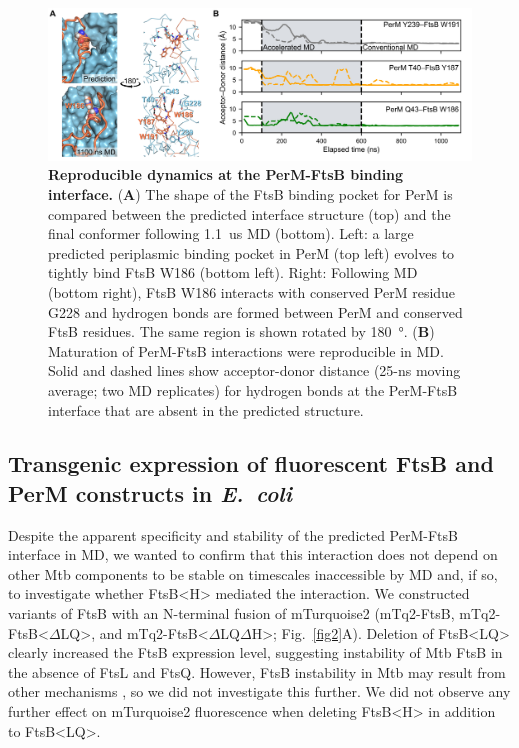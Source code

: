 \documentclass[twocolumn,pdflatex,sn-nature]{sn-jnl}%
\def\textsuperscript#1{<#1>}%
\newcommand\ec{\textit{E.~coli}}
\newcommand\mtb{Mtb}
\newcommand\ftsbLQ{FtsB\textsuperscript{LQ}}
\newcommand\ftsbH{FtsB\textsuperscript{H}}
\newcommand\ftsbdLQ{FtsB\textsuperscript{$\Delta{}$LQ}}
\newcommand\ftsbdLQdH{FtsB\textsuperscript{$\Delta{}$LQ$\Delta{}$H}}
\begin{document}
\begin{figure}[htb]
    \centering
    \includegraphics[width=1.0\textwidth]{../figures/fig1_2.png}
    \caption{
        \textbf{Reproducible dynamics at the PerM-FtsB binding interface.}
        (\textbf{A}) The shape of the FtsB binding pocket for PerM is compared between the predicted interface structure (top) and the final conformer following \qty{1.1}{us} MD (bottom). Left: a large predicted periplasmic binding pocket in PerM (top left) evolves to tightly bind FtsB W186 (bottom left). Right: Following MD (bottom right), FtsB W186 interacts with conserved PerM residue G228 and hydrogen bonds are formed between PerM and conserved FtsB residues. The same region is shown rotated by \qty{180}{\degree}.
        (\textbf{B}) Maturation of PerM-FtsB interactions were reproducible in MD. Solid and dashed lines show acceptor-donor distance (25-ns moving average; two MD replicates) for hydrogen bonds at the PerM-FtsB interface that are absent in the predicted structure.
    }\label{fig1_2}
\end{figure}

\subsection{Transgenic expression of fluorescent FtsB and PerM constructs in \ec{}}

Despite the apparent specificity and stability of the predicted PerM-FtsB interface in MD, we wanted to confirm that this interaction does not depend on other \mtb{} components to be stable on timescales inaccessible by MD and, if so, to investigate whether \ftsbH{} mediated the interaction.
We constructed variants of FtsB with an N-terminal fusion of mTurquoise2 (mTq2-FtsB, mTq2-\ftsbdLQ{}, and mTq2-\ftsbdLQdH{}; Fig.~\ref{fig2}A). Deletion of \ftsbLQ{} clearly increased the FtsB expression level, suggesting instability of \mtb{} FtsB in the absence of FtsL and FtsQ.
However, FtsB instability in \mtb{} may result from other mechanisms \citep{wangPersistentMycobacteriumTuberculosis2019}, so we did not investigate this further.
We did not observe any further effect on mTurquoise2 fluorescence when deleting \ftsbH{} in addition to \ftsbLQ{}.
\end{document}
